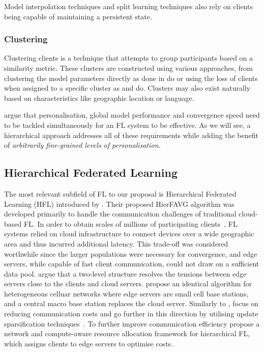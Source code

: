 Model interpolation techniques and split learning techniques also rely on clients being capable of maintaining a persistent state. 

\subsubsection{Clustering}

Clustering clients is a technique that attempts to group participants based on a similarity metric. These clusters are constructed using various approaches, from clustering the model parameters directly as done in \citet{ClusterFL} do or using the loss of clients when assigned to a specific cluster as \citet{ThreeApproachesMansour} and \citet{AnEfficientFrameworkForClusteredFL} do. Clusters may also exist naturally based on characteristics like geographic location or language.

\citet{ImprovingFederatedLearningPersonalizationviaModelAgnosticMeta} argue that personalisation, global model performance and convergence speed need to be tackled simultaneously for an FL system to be effective. As we will see, a hierarchical approach addresses all of these requirements while adding the benefit of \emph{arbitrarily fine-grained levels of personalisation.}

\subsection{Hierarchical Federated Learning}\label{sec:back:HFL}


The most relevant subfield of FL to our proposal is Hierarchical Federated Learning (HFL) introduced by \citet{Client-Edge-CloudHierFL}. Their proposed HierFAVG algorithm was developed primarily to handle the communication challenges of traditional cloud-based FL\@. In order to obtain scales of millions of participating clients~\citep{GoogleKeyboard, ScaleSystemDesign}, FL systems relied on cloud infrastructure to connect devices over a wide geographic area and thus incurred additional latency. This trade-off was considered worthwhile since the larger populations were necessary for convergence, and edge servers, while capable of fast client communication, could not draw on a sufficient data pool. \citet{Client-Edge-CloudHierFL} argue that a two-level structure resolves the tensions between edge servers close to the clients and cloud servers. \citet{Hier_Het_Cellular} propose an identical algorithm for heterogeneous celluar networks where edge servers are small cell base stations, and a central macro base station replaces the cloud server. Similarly to \citet{Client-Edge-CloudHierFL}, \citet{Hier_Het_Cellular} focus on reducing communication costs and go further in this direction by utilising update sparsification techniques~\citep{DeepGradientCompressin,CommCompressionDecent}. To further improve communication efficiency \citet{HFELJointEdgeResource} propose a network and compute-aware resource allocation framework for hierarchical FL, which assigns clients to edge servers to optimise costs.





